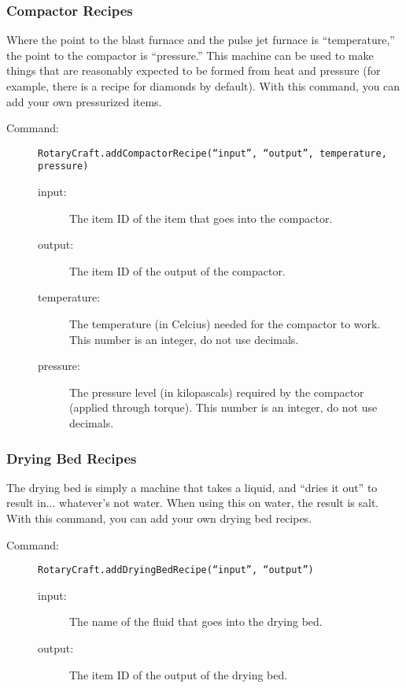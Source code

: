 \documentclass[letterpaper,titlepage,12pt]{article}
\begin{document}
\subsubsection{Compactor Recipes}

Where the point to the blast furnace and the pulse jet furnace is ``temperature,'' the point to the compactor is ``pressure.''  This machine can be used to make things that are reasonably expected to be formed from heat and pressure (for example, there is a recipe for diamonds by default).  With this command, you can add your own pressurized items.

\begin{description}
\item[Command:] \texttt{RotaryCraft.addCompactorRecipe(``input'', ``output'', temperature, pressure)}
\begin{description}
\item [input:] The item ID of the item that goes into the compactor.
\item [output:] The item ID of the output of the compactor.
\item [temperature:] The temperature (in Celcius) needed for the compactor to work.  This number is an integer, do not use decimals.
\item [pressure:] The pressure level (in kilopascals) required by the compactor (applied through torque).  This number is an integer, do not use decimals.
\end{description}
\end{description}

\subsubsection{Drying Bed Recipes}

The drying bed is simply a machine that takes a liquid, and ``dries it out'' to result in... whatever's not water.  When using this on water, the result is salt.  With this command, you can add your own drying bed recipes.

\begin{description}
\item[Command:] \texttt{RotaryCraft.addDryingBedRecipe(``input'', ``output'')}
\begin{description}
\item [input:] The name of the fluid that goes into the drying bed.
\item [output:] The item ID of the output of the drying bed.
\end{description}
\end{description}
\end{document}
